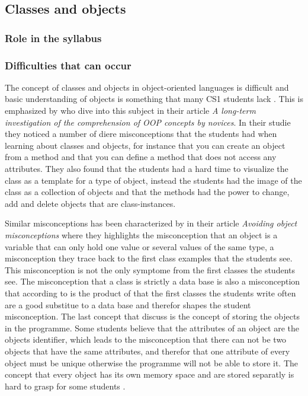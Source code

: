 \subsection{Classes and objects}

\subsubsection{Role in the syllabus}

\subsubsection{Difficulties that can occur}

The concept of classes and objects in object-oriented languages is difficult and basic understanding of objects is something that many CS1 students lack \parencite{Kaczmarczyk2010}. This is emphasized by \textcite{Ragonis2005OOP} who dive into this subject in their article \emph{A long-term investigation of the comprehension of OOP concepts by novices}. In their studie they noticed a number of diere misconceptions that the students had when learning about classes and objects, for instance that you can create an object from a method and that you can define a method that does not access any attributes. They also found that the students had a hard time to visualize the class as a template for a type of object, instead the students had the image of the class as a collection of objects and that the methods had the power to change, add and delete objects that are class-instances. 

Similar misconceptions has been characterized by \textcite{Holland1997} in their article \emph{Avoiding object misconceptions} where they highlights the misconception that an object is a variable that can only hold one value or several values of the same type, a misconception they trace back to the first class examples that the students see. This misconception is not the only symptome from the first classes the students see. The misconception that a class is strictly a data base is also a misconception that according to \textcite{Holland1997} is the product of that the first classes the students write often are a good substitue to a data base and therefor shapes the student misconception. The last concept that \textcite{Holland1997} discuss is the concept of storing the objects in the programme. Some students believe that the attributes of an object are the objects identifier, which leads to the misconception that there can not be two objects that have the same attributes, and therefor that one attribute of every object must be unique otherwise the programme will not be able to store it. The concept that every object has its own memory space and are stored separatly is hard to grasp for some students \parencite{Holland1997,Ragonis2005}. 

